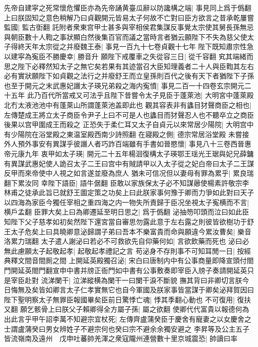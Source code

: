 先帝自建寜之死常懷危懼臣亦為先帝誦黄臺瓜辭以防讒構之端|{
	事見同上爲于僞翻}
上曰朕固知之意色稍解乃曰貞觀開元皆易太子何故不亡對曰臣方欲言之昔承乾屢嘗監國|{
	監古衘翻}
託附者衆東宫甲士甚多與宰相侯君集謀反事覺太宗使其舅長孫無忌與朝臣數十人鞫之事狀顯白然後集百官而議之當時言者猶云願陛下不失為慈父使太子得終天年太宗從之并廢魏王泰|{
	事見一百九十七卷貞觀十七年}
陛下既知肅宗性急以建寜為寃臣不勝慶幸|{
	勝音升}
願陛下戒覆車之失從容三日|{
	從千容翻}
䆒其端緒而思之陛下必釋然知太子之無它矣若果有其迹當召大臣知理義者二十人與臣鞫其左右必有實狀願陛下如貞觀之法行之并廢舒王而立皇孫則百代之後有天下者猶陛下子孫也至于開元之末武惠妃譖太子瑛兄弟殺之海内寃憤|{
	事見二百一十四卷玄宗開元二十五年}
此乃百代所當戒又可法乎且陛下昔嘗令太子見臣于蓬萊池|{
	大明宮中蓬萊殿北冇太液池池中有蓬萊山所謂蓬萊池盖即此也}
觀其容表非有蠭目犲聲商臣之相也|{
	左傳楚成王將立太子商臣令尹子上曰不可是人也蠭目而犲聲忍人也不聽卒立之商臣後果以宫甲圍成王而殺之}
正恐失于柔仁耳又太子自貞元以來常居少陽院|{
	大明宫中有少陽院在浴堂殿之東温室殿西南少詩照翻}
在寢殿之側|{
	德宗常居浴堂殿}
未嘗接外人預外事安有異謀乎彼譖人者巧詐百端雖有手書如晉愍懷|{
	事見八十三卷西晉惠帝元康九年}
衷甲如太子瑛|{
	開元二十五年楊洄復構太子瑛鄂王瑶光王琚與妃兄薛鏞有異謀武惠妃使人詭召太子二王曰宫中有賊請甲以入太子從之妃白帝曰太子二王謀反甲而來帝使中人視之如言遂並廢為庶人}
猶未可信况但以妻母有罪為累乎|{
	累良瑞翻下累汝同}
幸陛下語臣|{
	語牛倨翻}
臣敢以家族保太子必不知謀曏使楊素許敬宗李林甫之徒承此旨已就舒王圖定策之功矣上曰此朕家事何豫于卿而力爭如此對曰天子以四海為家臣今獨任宰相之重四海之内一物失所責歸于臣况坐視太子寃横而不言|{
	横戶孟翻}
臣罪大矣上曰為卿遷延至明日思之|{
	爲于僞翻}
泌抽笏叩頭而泣曰如此臣知陛下父子慈孝如初矣然陛下還宮當自審思勿露此意于左右露之則彼皆欲樹功于舒王太子危矣上曰具曉卿意泌歸謂子弟曰吾本不樂富貴而命與願違今累汝曹矣|{
	樂音洛累力瑞翻}
太子遣人謝泌曰若必不可救欲先自仰藥何如|{
	言欲飲藥而死也}
泌曰必無此慮願太子起敬起孝|{
	起敬起孝禮記之言}
苟泌身不存則事不可知耳閒一日|{
	按經典釋文間音間厠之間}
上開延英殿獨召泌|{
	宋白曰唐制内中有公事商量即降宣頭付閤門開延英閤門翻宣申中書并牓正衙門如中書有公事敷奏即宰臣入牓子奏請開延英只是宰臣赴對}
流涕闌干|{
	泣涕縱横為闌干一曰闌干淚不斷貌}
撫其背曰非卿切言朕今日悔無及矣皆如卿言太子仁孝實無它也自今軍國及朕家事皆當謀于卿矣泌拜賀因曰陛下聖明察太子無罪臣報國畢矣臣前日驚悸亡魂|{
	悸其季翻心動也}
不可復用|{
	復扶又翻}
願乞骸骨上曰朕父子賴卿得全方屬子孫|{
	屬之欲翻}
使卿代代富貴以報德何為出此言乎甲午詔李萬不知避宗宜杖死|{
	左傳齊盧蒲癸臣于慶舍有寵妻之以女慶舍之士謂盧蒲癸曰男女辨姓子不避宗何也癸曰宗不避余余獨安避之}
李昇等及公主五子皆流嶺南及遠州　戊申吐蕃帥羌渾之衆寇隴州連營數十里京城震恐|{
	帥讀曰率}
